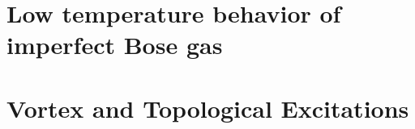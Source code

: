 \documentclass{article}
\begin{document}
\section{Low temperature behavior of imperfect Bose gas}

\section{Vortex and Topological Excitations}
\end{document}
